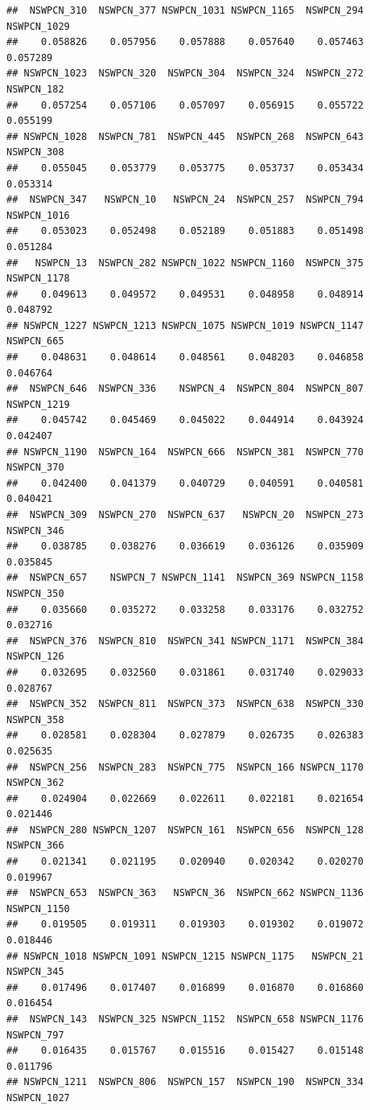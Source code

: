 \documentclass{article}\usepackage[]{graphicx}\usepackage[]{color}
\makeatletter
\newenvironment{kframe}{%
 \def\at@end@of@kframe{}%
 \ifinner\ifhmode%
  \def\at@end@of@kframe{\end{minipage}}%
  \begin{minipage}{\columnwidth}%
 \fi\fi%
 \def\FrameCommand##1{\hskip\@totalleftmargin \hskip-\fboxsep
 \colorbox{shadecolor}{##1}\hskip-\fboxsep
     \hskip-\linewidth \hskip-\@totalleftmargin \hskip\columnwidth}%
 \MakeFramed {\advance\hsize-\width
   \@totalleftmargin\z@ \linewidth\hsize
   \@setminipage}}%
 {\par\unskip\endMakeFramed%
 \at@end@of@kframe}
\newenvironment{knitrout}{}{} %
\makeatother
\begin{document}
\begin{knitrout}
\begin{kframe}
\begin{verbatim}
##  NSWPCN_310  NSWPCN_377 NSWPCN_1031 NSWPCN_1165  NSWPCN_294 NSWPCN_1029 
##    0.058826    0.057956    0.057888    0.057640    0.057463    0.057289 
## NSWPCN_1023  NSWPCN_320  NSWPCN_304  NSWPCN_324  NSWPCN_272  NSWPCN_182 
##    0.057254    0.057106    0.057097    0.056915    0.055722    0.055199 
## NSWPCN_1028  NSWPCN_781  NSWPCN_445  NSWPCN_268  NSWPCN_643  NSWPCN_308 
##    0.055045    0.053779    0.053775    0.053737    0.053434    0.053314 
##  NSWPCN_347   NSWPCN_10   NSWPCN_24  NSWPCN_257  NSWPCN_794 NSWPCN_1016 
##    0.053023    0.052498    0.052189    0.051883    0.051498    0.051284 
##   NSWPCN_13  NSWPCN_282 NSWPCN_1022 NSWPCN_1160  NSWPCN_375 NSWPCN_1178 
##    0.049613    0.049572    0.049531    0.048958    0.048914    0.048792 
## NSWPCN_1227 NSWPCN_1213 NSWPCN_1075 NSWPCN_1019 NSWPCN_1147  NSWPCN_665 
##    0.048631    0.048614    0.048561    0.048203    0.046858    0.046764 
##  NSWPCN_646  NSWPCN_336    NSWPCN_4  NSWPCN_804  NSWPCN_807 NSWPCN_1219 
##    0.045742    0.045469    0.045022    0.044914    0.043924    0.042407 
## NSWPCN_1190  NSWPCN_164  NSWPCN_666  NSWPCN_381  NSWPCN_770  NSWPCN_370 
##    0.042400    0.041379    0.040729    0.040591    0.040581    0.040421 
##  NSWPCN_309  NSWPCN_270  NSWPCN_637   NSWPCN_20  NSWPCN_273  NSWPCN_346 
##    0.038785    0.038276    0.036619    0.036126    0.035909    0.035845 
##  NSWPCN_657    NSWPCN_7 NSWPCN_1141  NSWPCN_369 NSWPCN_1158  NSWPCN_350 
##    0.035660    0.035272    0.033258    0.033176    0.032752    0.032716 
##  NSWPCN_376  NSWPCN_810  NSWPCN_341 NSWPCN_1171  NSWPCN_384  NSWPCN_126 
##    0.032695    0.032560    0.031861    0.031740    0.029033    0.028767 
##  NSWPCN_352  NSWPCN_811  NSWPCN_373  NSWPCN_638  NSWPCN_330  NSWPCN_358 
##    0.028581    0.028304    0.027879    0.026735    0.026383    0.025635 
##  NSWPCN_256  NSWPCN_283  NSWPCN_775  NSWPCN_166 NSWPCN_1170  NSWPCN_362 
##    0.024904    0.022669    0.022611    0.022181    0.021654    0.021446 
##  NSWPCN_280 NSWPCN_1207  NSWPCN_161  NSWPCN_656  NSWPCN_128  NSWPCN_366 
##    0.021341    0.021195    0.020940    0.020342    0.020270    0.019967 
##  NSWPCN_653  NSWPCN_363   NSWPCN_36  NSWPCN_662 NSWPCN_1136 NSWPCN_1150 
##    0.019505    0.019311    0.019303    0.019302    0.019072    0.018446 
## NSWPCN_1018 NSWPCN_1091 NSWPCN_1215 NSWPCN_1175   NSWPCN_21  NSWPCN_345 
##    0.017496    0.017407    0.016899    0.016870    0.016860    0.016454 
##  NSWPCN_143  NSWPCN_325 NSWPCN_1152  NSWPCN_658 NSWPCN_1176  NSWPCN_797 
##    0.016435    0.015767    0.015516    0.015427    0.015148    0.011796 
## NSWPCN_1211  NSWPCN_806  NSWPCN_157  NSWPCN_190  NSWPCN_334 NSWPCN_1027 

\end{verbatim}
\end{kframe}
\end{knitrout}
\end{document}
